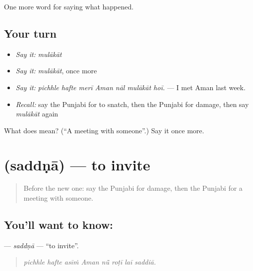\begin{grammarlens}[title={What you've built}]
One more word for saying what happened.
\end{grammarlens}

\subsection*{Your turn}
\begin{itemize}
\raggedright
  \item \emph{Say it:} \emph{mulākāt}
  \item \emph{Say it:} \emph{mulākāt}, once more
  \item \emph{Say it:} \emph{pichhle hafte merī Aman nāl mulākāt hoī.} — I met Aman last week.
  \item \emph{Recall:} say the Punjabi for to snatch, then the Punjabi for damage, then say \emph{mulākāt} again
\end{itemize}

\begin{tcolorbox}[breakable,colback=teal!4,colframe=teal!35!black,title={Before you move on}]
What does  mean? (\textquotedblleft{}A meeting with someone\textquotedblright{}.) Say it once more.
\end{tcolorbox}
\section[\texorpdfstring{\pa{ਸੱਦਣਾ} (saddṇā)}{ਸੱਦਣਾ (saddṇā)}]{ (saddṇā) — to invite}

\label{lesson:PA-C312-saddna}



\begin{quote}
Before the new one: say the Punjabi for damage, then the Punjabi for a meeting with someone.
\end{quote}

\subsection*{You'll want to know: }
\textbf{} — \emph{saddṇā} — \textquotedblleft{}to invite\textquotedblright{}.

\begin{quote}
       
\end{quote}

\begin{quote}
\emph{pichhle hafte asīṁ Aman nū̃ roṭī laī saddiā.}
\end{quote}


